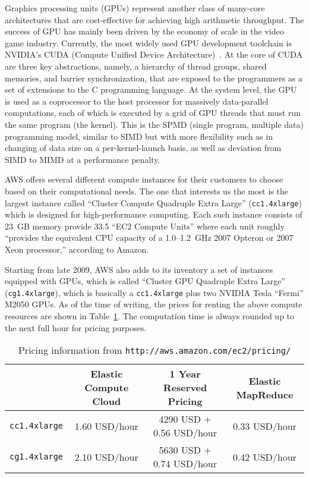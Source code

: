 \begin{CJK}{Bg5}{bsmi}
Graphics processing units (GPUs) represent another class of many-core
architectures that are cost-effective for achieving high arithmetic
throughput.
%
The success of GPU has mainly been driven by the economy of scale in
the video game industry.
%
Currently, the most widely used GPU development toolchain is NVIDIA's
CUDA (Compute Unified Device Architecture)~\cite{Kirk2010CUDA}.
%
At the core of CUDA are three key abstractions, namely, a hierarchy of
thread groups, shared memories, and barrier synchronization, that are
exposed to the programmers as a set of extensions to the C programming
language.
%
At the system level, the GPU is used as a coprocessor to the host
processor for massively data-parallel computations, each of which is
executed by a grid of GPU threads that must run the same program (the
kernel).
%
This is the SPMD (single program, multiple data) programming model,
similar to SIMD but with more flexibility such as in changing of data
size on a per-kernel-launch basis, as well as deviation from SIMD to
MIMD at a performance penalty.

AWS offers several different compute instances for their customers to
choose based on their computational needs.
%
The one that interests us the most is the largest instance called
``Cluster Compute Quadruple Extra Large'' (\texttt{cc1.4xlarge})
which is designed for high-performance computing.
%
Each such instance consists of 23~GB memory provide 33.5 ``EC2 Compute
Units'' where each unit roughly ``provides the equivalent CPU capacity
of a 1.0--1.2~GHz 2007 Opteron or 2007 Xeon processor,'' according to
Amazon.

Starting from late 2009, AWS also adds to its inventory a set of
instances equipped with GPUs, which is called ``Cluster GPU Quadruple Extra
Large'' (\texttt{cg1.4xlarge}), which is basically a
\texttt{cc1.4xlarge} plus two NVIDIA Tesla ``Fermi'' M2050 GPUs.
%
As of the time of writing, the prices for renting the above compute
resources are shown in Table~\ref{tab:ec2-pricing}.
%
The computation time is always rounded up to the next full hour for
pricing purposes.

\begin{table}
  \begin{center}\vspace*{-2ex}
    \caption{Pricing information from
      \texttt{http://aws.amazon.com/ec2/pricing/}}\vspace*{-3ex}
    \label{tab:ec2-pricing}
    \begin{tabular}{l||c|c|c}
      & Elastic Compute Cloud & 1 Year Reserved Pricing & Elastic MapReduce \\ \hline\hline
      \texttt{cc1.4xlarge} & 1.60 USD/hour & 4290 USD + 0.56 USD/hour & 0.33 USD/hour \\
      \texttt{cg1.4xlarge} & 2.10 USD/hour & 5630 USD + 0.74 USD/hour & 0.42 USD/hour
    \end{tabular}\vspace*{-5ex}
  \end{center}
\end{table}


\end{CJK}
